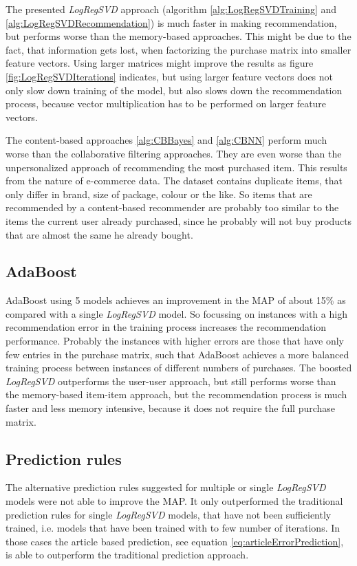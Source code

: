 \documentclass[10pt]{reportMaster}
\begin{document}
The presented \textit{LogRegSVD} approach (algorithm \ref{alg:LogRegSVDTraining} and \ref{alg:LogRegSVDRecommendation}) is much faster in making recommendation, but performs worse than the memory-based approaches.
This might be due to the fact, that information gets lost, when factorizing the purchase matrix into smaller feature vectors.
Using larger matrices might improve the results as figure \ref{fig:LogRegSVDIterations} indicates, but using larger feature vectors does not only slow down training of the model, but also slows down the recommendation process, because vector multiplication has to be performed on larger feature vectors.

The content-based approaches \ref{alg:CBBayes} and \ref{alg:CBNN} perform much worse than the collaborative filtering approaches.
They are even worse than the unpersonalized approach of recommending the most purchased item.
This results from the nature of e-commerce data.
The dataset contains duplicate items, that only differ in brand, size of package, colour or the like.
So items that are recommended by a content-based recommender are probably too similar to the items the current user already purchased, since he probably will not buy products that are almost the same he already bought.


\subsection{AdaBoost}
\label{sec:discAdaBoost}
AdaBoost using 5 models achieves an improvement in the MAP of about 15\% as compared with a single \textit{LogRegSVD} model.
So focussing on instances with a high recommendation error in the training process increases the recommendation performance.
Probably the instances with higher errors are those that have only few entries in the purchase matrix, such that AdaBoost achieves a more balanced training process between instances of different numbers of purchases.
The boosted \textit{LogRegSVD} outperforms the user-user approach, but still performs worse than the memory-based item-item approach, but the recommendation process is much faster and less memory intensive, because it does not require the full purchase matrix.


\subsection{Prediction rules}
\label{sec:discPredRules}
The alternative prediction rules suggested for multiple or single \textit{LogRegSVD} models were not able to improve the MAP.
It only outperformed the traditional prediction rules for single \textit{LogRegSVD} models, that have not been sufficiently trained, i.e. models that have been trained with to few number of iterations.
In those cases the article based prediction, see equation \ref{eq:articleErrorPrediction}, is able to outperform the traditional prediction approach.
\end{document}

